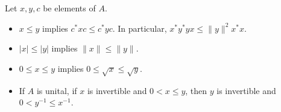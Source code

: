 Let $x, y, c$ be elements of $A$.
\begin{itemize}
\item[(i)] $x \leq y$ implies $c^*xc \leq c^*yc$. In particular, $x^*y^*yx \leq \|y\|^2x^*x$.
\item[(ii)] $|x| \leq |y|$ implies $\|x\| \leq \|y\|$.
\item[(iii)] $0 \leq x \leq y$ implies $0 \leq \sqrt{x} \leq \sqrt{y}$.
\item[(iv)] If $A$ is unital, if $x$ is invertible and $0 < x \leq y$, then $y$ is invertible and $0 < y^{-1} \leq x^{-1}$.
\end{itemize}
